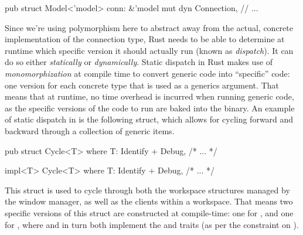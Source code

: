 \begin{rustblock}
  pub struct Model<'model> {
    conn: &'model mut dyn Connection,
    // ...
  }
\end{rustblock}


Since we're using polymorphism here to abstract away from the actual,
concrete implementation of the connection type, Rust needs to be able to
determine at runtime which specific version it should actually run (known as
\textit{dispatch})\cite{therustbook, rustblogtraits}. It can do so either
\textit{statically} or \textit{dynamically}. Static dispatch in Rust makes
use of \textit{monomorphization} at compile time to convert generic code into
``specific'' code: one version for each concrete type that is used as a generics
argument\cite{therustbook, rustblogtraits}. That means that at runtime, no time
overhead is incurred when running generic code, as the specific versions of the
code to run are baked into the binary\cite{therustbook, rustblogtraits}. An
example of static dispatch in \wmrs is the following  struct, which
allows for cycling forward and backward through a collection of generic items.

\begin{rustblock}
  pub struct Cycle<T>
  where
    T: Identify + Debug,
  { /* ... */ }
\end{rustblock}
\begin{rustblock}
  impl<T> Cycle<T>
  where
      T: Identify + Debug,
  { /* ... */ }
\end{rustblock}

This struct is used to cycle through both the workspace structures managed
by the window manager, as well as the clients within a workspace. That
means two specific versions of this struct are constructed at compile-time:
one for , and one for , where
 and  in turn both implement the 
and  traits (as per the constraint on ).



